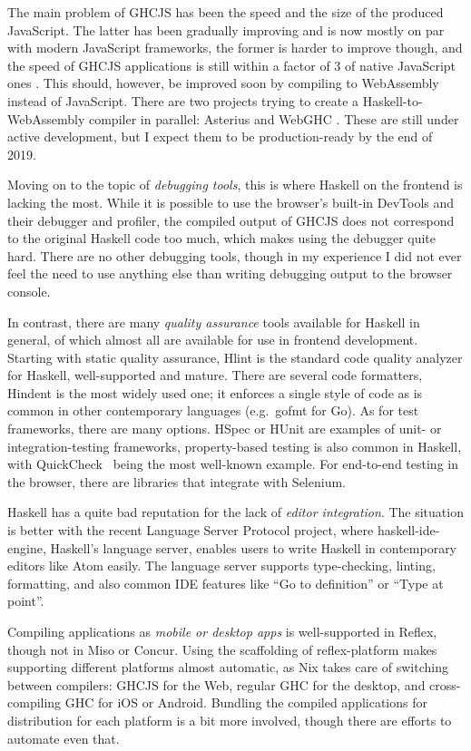 \documentclass[english,zadani,odsaz]{fitthesis}
\begin{document}
The main problem of GHCJS has been the speed and the size of the produced
JavaScript. The latter has been gradually improving and is now mostly on par
with modern JavaScript frameworks, the former is harder to improve though, and
the speed of GHCJS applications is still within a factor of 3 of native
JavaScript ones \cite{nanda_bench}. This should, however, be improved soon by
compiling to WebAssembly instead of JavaScript. There are two projects trying to
create a Haskell-to-WebAssembly compiler in parallel: Asterius \cite{asterius} and
WebGHC \cite{webghc}. These are still under active development, but I expect them
to be production-ready by the end of 2019.

Moving on to the topic of \emph{debugging tools}, this is where Haskell on the frontend
is lacking the most. While it is possible to use the browser's built-in DevTools
and their debugger and profiler, the compiled output of GHCJS does not
correspond to the original Haskell code too much, which makes using the debugger
quite hard. There are no other debugging tools, though in my experience I did
not ever feel the need to use anything else than writing debugging output to the
browser console.

In contrast, there are many \emph{quality assurance} tools available for Haskell in
general, of which almost all are available for use in frontend
development. Starting with static quality assurance, Hlint is the standard code
quality analyzer for Haskell, well-supported and mature. There are several code
formatters, Hindent is the most widely used one; it enforces a single style of
code as is common in other contemporary languages (e.g.~gofmt for Go). As
for test frameworks, there are many options. HSpec or HUnit are examples of
unit- or integration-testing frameworks, property-based testing is also common
in Haskell, with QuickCheck~\cite{claessen2011quickcheck} being the most
well-known example. For end-to-end testing in the browser, there are libraries
that integrate with Selenium.

Haskell has a quite bad reputation for the lack of \emph{editor integration}. The
situation is better with the recent Language Server Protocol project, where
haskell-ide-engine, Haskell's language server, enables users to write Haskell in
contemporary editors like Atom easily. The language server supports
type-checking, linting, formatting, and also common IDE features like
``Go to definition'' or ``Type at point''.

Compiling applications as \emph{mobile or desktop apps} is well-supported in Reflex,
though not in Miso or Concur. Using the scaffolding of reflex-platform makes
supporting different platforms almost automatic, as Nix takes care of switching
between compilers: GHCJS for the Web, regular GHC for the desktop, and
cross-compiling GHC for iOS or Android. Bundling the compiled applications for
distribution for each platform is a bit more involved, though there are efforts
to automate even that.
\end{document}
